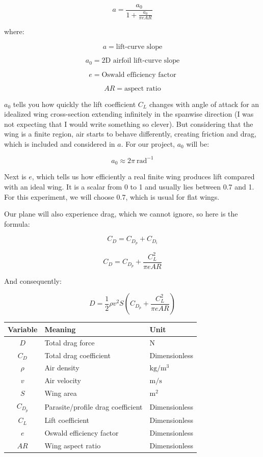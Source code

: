 \documentclass[12pt]{article}
\begin{document}
\[
a = \frac{a_0}{1+\frac{a_0}{\pi e AR}}
\]

where:

\[
a = \text{lift-curve slope}
\]

\[
a_0 = \text{2D airfoil lift-curve slope}
\]

\[
e = \text{Oswald efficiency factor}
\]

\[
AR = \text{aspect ratio}
\]

$a_0$ tells you how quickly the lift coefficient $C_L$ changes with angle of attack for an idealized wing cross-section extending infinitely in the spanwise direction (I was not expecting that I would write something so clever). But considering that the wing is a finite region, air starts to behave differently, creating friction and drag, which is included and considered in $a$. For our project, $a_0$ will be:

\[
a_0 \approx 2\pi\ \mathrm{rad}^{-1}
\]

Next is $e$, which tells us how efficiently a real finite wing produces lift compared with an ideal wing. It is a scalar from 0 to 1 and usually lies between 0.7 and 1. For this experiment, we will choose 0.7, which is usual for flat wings.

Our plane will also experience drag, which we cannot ignore, so here is the formula:

\[
C_D = C_{D_p} + C_{D_i}
\]

\[
C_D = C_{D_p} + \frac{C_L^2}{\pi e AR}
\]

And consequently:

\[
D = \frac{1}{2}\rho v^2 S
\left(
C_{D_p} + \frac{C_L^2}{\pi e AR}
\right)
\]

\renewcommand{\arraystretch}{2}
\begin{center}
\begin{tabular}{c|l|l}
\toprule
\textbf{Variable} & \textbf{Meaning} & \textbf{Unit} \\
\midrule
$D$ & Total drag force & $\mathrm{N}$ \\
$C_D$ & Total drag coefficient & Dimensionless \\
$\rho$ & Air density & $\mathrm{kg/m^3}$ \\
$v$ & Air velocity & $\mathrm{m/s}$ \\
$S$ & Wing area & $\mathrm{m^2}$ \\
$C_{D_p}$ & Parasite/profile drag coefficient & Dimensionless \\
$C_L$ & Lift coefficient & Dimensionless \\
$e$ & Oswald efficiency factor & Dimensionless \\
$AR$ & Wing aspect ratio & Dimensionless \\
\bottomrule
\end{tabular}
\end{center}
\end{document}

